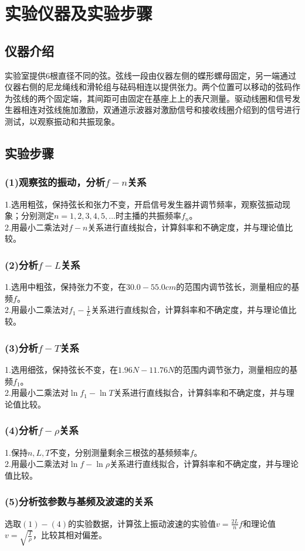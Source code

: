 \documentclass{ctexart}
\begin{document}
\section{实验仪器及实验步骤}
\subsection{仪器介绍}
实验室提供6根直径不同的弦。弦线一段由仪器左侧的蝶形螺母固定，另一端通过仪器右侧的尼龙绳线和滑轮组与砝码相连以提供张力。两个位置可以移动的弦码作为弦线的两个固定端，其间距可由固定在基座上上的表尺测量。驱动线圈和信号发生器相连对弦线施加激励，双通道示波器对激励信号和接收线圈介绍到的信号进行测试，以观察振动和共振现象。
\subsection{实验步骤}
\subsubsection*{(1)观察弦的振动，分析$f-n$关系}
\noindent 1.选用粗弦，保持弦长和张力不变，开启信号发生器并调节频率，观察弦振动现象；分别测定$n=1,2,3,4,5,...$时主播的共振频率$f_n$。\\
2.用最小二乘法对$f-n$关系进行直线拟合，计算斜率和不确定度，并与理论值比较。
\subsubsection*{(2)分析$f-L$关系}
\noindent 1.选用中粗弦，保持张力不变，在$30.0-55.0cm$的范围内调节弦长，测量相应的基频$f$。\\
2.用最小二乘法对$f_1-\frac{1}{L}$关系进行直线拟合，计算斜率和不确定度，并与理论值比较。
\subsubsection*{(3)分析$f-T$关系}
\noindent 1.选用细弦，保持弦长不变，在$1.96N-11.76N$的范围内调节张力，测量相应的基频$f_1$。\\
2.用最小二乘法对$\ln{f_1}-\ln{T}$关系进行直线拟合，计算斜率和不确定度，并与理论值比较。
\subsubsection*{(4)分析$f-\rho$关系}
\noindent 1.保持$n,L,T$不变，分别测量剩余三根弦的基频频率$f$。\\
2.用最小二乘法对$\ln{f}-\ln{\rho}$关系进行直线拟合，计算斜率和不确定度，并与理论值比较。
\subsubsection*{(5)分析弦参数与基频及波速的关系}
\noindent 选取$(1)-(4)$的实验数据，计算弦上振动波速的实验值$v=\displaystyle\frac{2L}{n}f$和理论值$v=\displaystyle\sqrt{\frac{T}{\rho}}$，比较其相对偏差。
\end{document}
